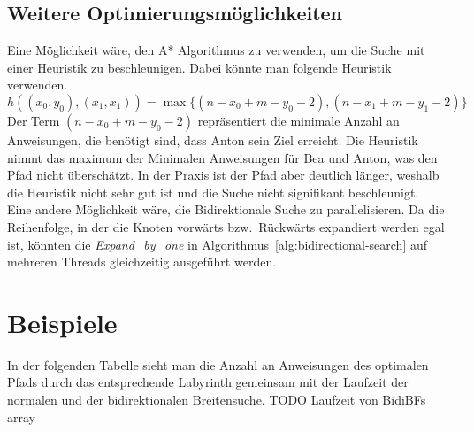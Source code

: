 \documentclass[a4paper,10pt,ngerman]{scrartcl}
\begin{document}
    \subsection{Weitere Optimierungsmöglichkeiten}
    Eine Möglichkeit wäre, den A* Algorithmus zu verwenden, um die Suche mit einer Heuristik zu beschleunigen.
    Dabei könnte man folgende Heuristik verwenden.
    \[h((x_0, y_0), (x_1, x_1)) = \max\{(n - x_0 + m - y_0 - 2), (n - x_1 + m - y_1 - 2)\}\]
    Der Term $(n - x_0 + m - y_0 - 2)$ repräsentiert die minimale Anzahl an Anweisungen, die benötigt sind, dass Anton sein Ziel erreicht.
    Die Heuristik nimmt das maximum der Minimalen Anweisungen für Bea und Anton, was den Pfad nicht überschätzt.
    In der Praxis ist der Pfad aber deutlich länger, weshalb die Heuristik nicht sehr gut ist und die Suche nicht signifikant beschleunigt.\\

    Eine andere Möglichkeit wäre, die Bidirektionale Suche zu parallelisieren.
    Da die Reihenfolge, in der die Knoten vorwärts bzw.\ Rückwärts expandiert werden egal ist, könnten die \textit{Expand\_by\_one} in Algorithmus~\ref{alg:bidirectional-search} auf mehreren Threads gleichzeitig ausgeführt werden.


    \section{Beispiele}
    In der folgenden Tabelle sieht man die Anzahl an Anweisungen des optimalen Pfads durch das entsprechende Labyrinth gemeinsam mit der Laufzeit der normalen und der bidirektionalen Breitensuche. TODO Laufzeit von BidiBFs array \\
\end{document}
